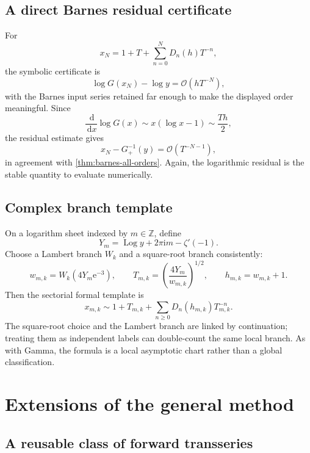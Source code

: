 \documentclass[11pt]{article}
\theoremstyle{definition}
\theoremstyle{remark}
\newcommand{\e}{\mathrm e}
\newcommand{\ii}{\mathrm i}
\newcommand{\dd}{\,\mathrm d}
\newcommand{\BigO}{\mathcal O}
\newcommand{\Barinv}{G_{+}^{-1}}
\newcommand{\Log}{\operatorname{Log}}
\begin{document}
\subsection{A direct Barnes residual certificate}

For
\[
 x_N=1+T+\sum_{n=0}^{N}D_n(h)T^{-n},
\]
the symbolic certificate is
\begin{equation}\label{eq:barnes-residual-cert}
 \log G(x_N)-\log y=\BigO(hT^{-N}),
\end{equation}
with the Barnes input series retained far enough to make the displayed order meaningful.  Since
\[
 \frac{\dd}{\dd x}\log G(x)
 \sim x(\log x-1)\sim \frac{Th}{2},
\]
the residual estimate gives
\[
 x_N-\Barinv(y)=\BigO(T^{-N-1}),
\]
in agreement with \cref{thm:barnes-all-orders}.  Again, the logarithmic residual is the stable quantity to evaluate numerically.

\subsection{Complex branch template}

On a logarithm sheet indexed by \(m\in\mathbb Z\), define
\[
 Y_m=\Log y+2\pi\ii m-\zeta'(-1).
\]
Choose a Lambert branch \(W_k\) and a square-root branch consistently:
\[
 w_{m,k}=W_k(4Y_m\e^{-3}),
 \qquad T_{m,k}=\left(\frac{4Y_m}{w_{m,k}}\right)^{1/2},
 \qquad h_{m,k}=w_{m,k}+1.
\]
Then the sectorial formal template is
\begin{equation}\label{eq:barnes-complex-template}
 x_{m,k}\sim1+T_{m,k}
 +\sum_{n\ge0}D_n(h_{m,k})T_{m,k}^{-n}.
\end{equation}
The square-root choice and the Lambert branch are linked by continuation; treating them as independent labels can double-count the same local branch.  As with Gamma, the formula is a local asymptotic chart rather than a global classification.

\section{Extensions of the general method}\label{sec:extensions}

\subsection{A reusable class of forward transseries}
\end{document}
